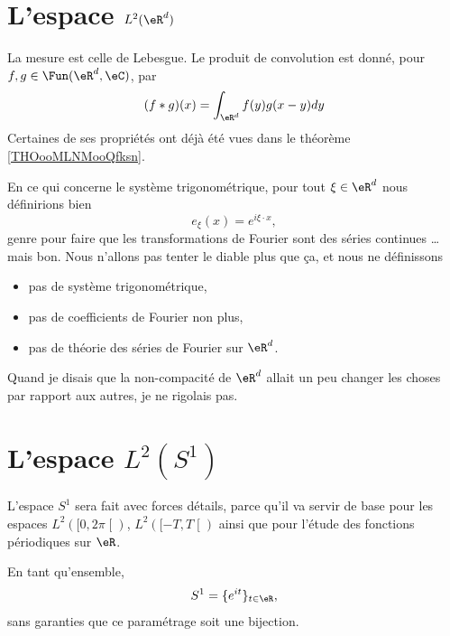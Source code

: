 \section{L'espace \( L^2(\eR^d)\)}

La mesure est celle de Lebesgue. Le produit de convolution est donné, pour \( f,g\in\Fun(\eR^d,\eC)\), par
\begin{equation}
	(f*g)(x)=\int_{\eR^d}f(y)g(x-y)dy
\end{equation}
Certaines de ses propriétés ont déjà été vues dans le théorème \ref{THOooMLNMooQfksn}.

En ce qui concerne le système trigonométrique, pour tout \( \xi\in \eR^d\) nous définirions bien
\begin{equation}
	e_{\xi}(x)= e^{i\xi\cdot x},
\end{equation}
genre pour faire que les transformations de Fourier sont des séries continues \ldots{} mais bon. Nous n'allons pas tenter le diable plus que ça, et nous ne définissons
\begin{itemize}
	\item pas de système trigonométrique,
	\item pas de coefficients de Fourier non plus,
	\item pas de théorie des séries de Fourier sur \( \eR^d\).
\end{itemize}
Quand je disais que la non-compacité de \( \eR^d\) allait un peu changer les choses par rapport aux autres, je ne rigolais pas.

\section{L'espace \( L^2(S^1)\)}

L'espace \( S^1\) sera fait avec forces détails, parce qu'il va servir de base pour les espaces \( L^2(\mathopen[ 0 , 2\pi \mathclose[)\), \( L^2(\mathopen[ -T , T \mathclose[)\) ainsi que pour l'étude des fonctions périodiques sur \( \eR\).

En tant qu'ensemble,
\begin{equation}
	S^1=\{  e^{it} \}_{t\in \eR},
\end{equation}
sans garanties que ce paramétrage soit une bijection.

